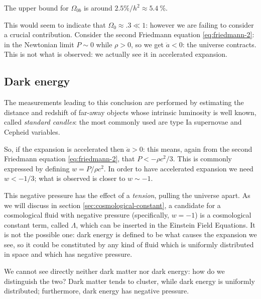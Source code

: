 \documentclass[main.tex]{subfiles}
\begin{document}
The upper bound for \(\Omega_{0b}\) is around \(2.5\%/h^2 \approx \SI{5.4}{\percent}\).



This would seem to indicate that \(\Omega_{0} \approx \num{.3} \ll 1\): however we are failing to consider a crucial contribution.
Consider the second Friedmann equation \eqref{eq:friedmann-2}: in the Newtonian limit \(P \sim 0\) while \( \rho >0 \), so we get \(\ddot{a} <0\): the universe contracts.
This is not what is observed: we actually see it in accelerated expansion.

\subsection{Dark energy}

The measurements leading to this conclusion are performed by estimating the distance and redshift of far-away objects whose intrinsic luminosity is well known, called \emph{standard candles}: the most commonly used are type Ia supernovae and Cepheid variables.

So, if the expansion is accelerated then \(\ddot{a} > 0\): this means, again from the second Friedmann equation \eqref{eq:friedmann-2}, that \(P < -\rho c^2/3\).
This is commonly expressed by defining \(w = P / \rho c^2\). 
In order to have accelerated expansion we need \(w < -1/3\); what is observed is closer to \(w \sim -1\).

This negative pressure has the effect of a \emph{tension}, pulling the universe apart.
As we will discuss in section \ref{sec:cosmological-constant}, a candidate for a cosmological fluid with negative pressure (specifically, \(w = -1\)) is a cosmological constant term, called \(\Lambda \), which can be inserted in the Einstein Field Equations.
It is not the possible one: dark energy is defined to be what causes the expansion we see, so it could be constituted by any kind of fluid which is uniformly distributed in space and which has negative pressure. 


We cannot see directly neither dark matter nor dark energy: how do we distinguish the two? Dark matter tends to cluster, while dark energy is uniformly distributed; furthermore, dark energy has negative pressure.
\end{document}
